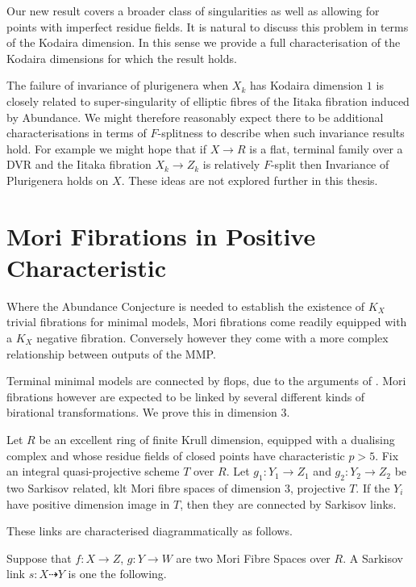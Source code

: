\documentclass[a4paper,12pt]{book}
\let \OldSection \section
\renewcommand{\section}[1]{\OldSection{#1} \thispagestyle{section}}
\begin{document}
	Our new result covers a broader class of singularities as well as allowing for points with imperfect residue fields. It is natural to discuss this problem in terms of the Kodaira dimension. In this sense we provide a full characterisation of the Kodaira dimensions for which the result holds.
	
	The failure of invariance of plurigenera when $X_{k}$ has Kodaira dimension $1$ is closely related to super-singularity of elliptic fibres of the Iitaka fibration induced by Abundance. We might therefore reasonably expect there to be additional characterisations in terms of $F$-splitness to describe when such invariance results hold. For example we might hope that if $X \to R$ is a flat, terminal family over a DVR and the Iitaka fibration $X_{k}\to Z_{k}$ is relatively $F$-split then Invariance of Plurigenera holds on $X$. These ideas are not explored further in this thesis.
	
	
	\section{Mori Fibrations in Positive Characteristic}
	
	Where the Abundance Conjecture is needed to establish the existence of $K_{X}$ trivial fibrations for minimal models, Mori fibrations come readily equipped with a $K_{X}$ negative fibration. Conversely however they come with a more complex relationship between outputs of the MMP. 
	
	Terminal minimal models are connected by flops, due to the arguments of \cite{kawamata2008flops}. Mori fibrations however are expected to be linked by several different kinds of birational transformations. We prove this in dimension $3$.
	
	\begin{theo}
		Let $R$ be an excellent ring of finite Krull dimension, equipped with a dualising complex and whose residue fields of closed points have characteristic $p>5$. Fix an integral quasi-projective scheme $T$ over $R$. Let $g_{1}:Y_{1} \to Z_{1}$ and $g_{2}:Y_{2} \to Z_{2}$ be two Sarkisov related, klt Mori fibre spaces of dimension $3$, projective $T$. If the $Y_{i}$ have positive dimension image in $T$, then they are connected by Sarkisov links.
	\end{theo}
	
	These links are characterised diagrammatically as follows.
	
	Suppose that $f:X \to Z$, $g:Y \to W$ are two Mori Fibre Spaces over $R$. A Sarkisov link $s:X \dashrightarrow Y$ is one the following.
	
\end{document}
